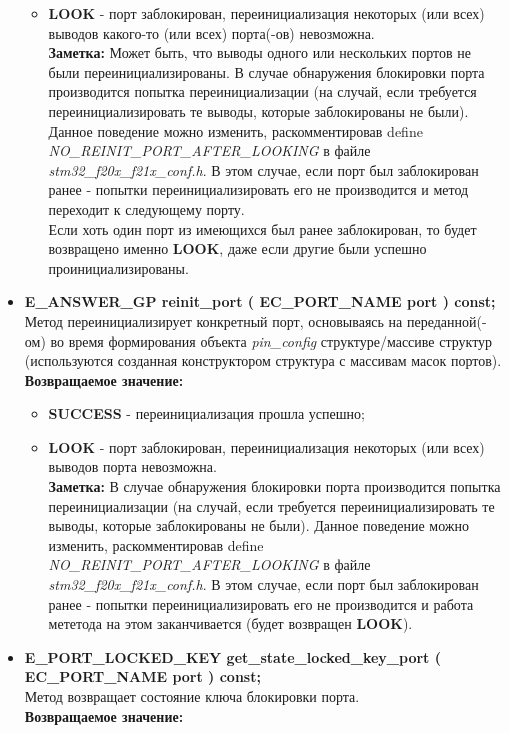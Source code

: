 \begin{itemize}
\begin{itemize}
		\item \textbf{LOOK} - порт заблокирован, переинициализация некоторых (или всех) выводов какого-то (или всех) порта(-ов) невозможна.\\\textbf{Заметка: } Может быть, что выводы одного или нескольких портов не были переинициализированы. В случае обнаружения блокировки порта производится попытка переинициализации (на случай, если требуется переинициализировать те выводы, которые заблокированы не были). Данное поведение можно изменить, раскомментировав define \textit{NO\_REINIT\_PORT\_AFTER\_LOOKING} в файле \textit{stm32\_f20x\_f21x\_conf.h}. В этом случае, если порт был заблокирован ранее - попытки переинициализировать его не производится и метод переходит к следующему порту.\\Если хоть один порт из имеющихся был ранее заблокирован, то будет возвращено именно \textbf{LOOK}, даже если другие были успешно проинициализированы.
	\end{itemize}
	\item \textbf{E\_ANSWER\_GP	reinit\_port	( EC\_PORT\_NAME port ) const;}\\Метод переинициализирует конкретный порт, основываясь на переданной(-ом) во время формирования объекта \textit{pin\_config} структуре/массиве структур (используются созданная конструктором структура с массивам масок портов).\\\textbf{Возвращаемое значение:}
	\begin{itemize}
		\item \textbf{SUCCESS} - переинициализация прошла успешно;
		\item \textbf{LOOK} - порт заблокирован, переинициализация некоторых (или всех) выводов порта невозможна.\\\textbf{Заметка: } В случае обнаружения блокировки порта производится попытка переинициализации (на случай, если требуется переинициализировать те выводы, которые заблокированы не были). Данное поведение можно изменить, раскомментировав define \textit{NO\_REINIT\_PORT\_AFTER\_LOOKING} в файле \textit{stm32\_f20x\_f21x\_conf.h}. В этом случае, если порт был заблокирован ранее - попытки переинициализировать его не производится и работа мететода на этом заканчивается (будет возвращен \textbf{LOOK}).
	\end{itemize}
	\item \textbf{E\_PORT\_LOCKED\_KEY	get\_state\_locked\_key\_port	( EC\_PORT\_NAME port ) const;}\\Метод возвращает состояние ключа блокировки порта.\\\textbf{Возвращаемое значение:}

\end{itemize}
